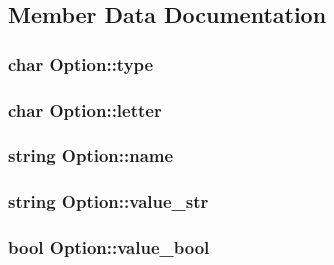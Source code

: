 \subsection{Member Data Documentation}
\hypertarget{struct_option_a08dcf2742c8429087baaacf694089cbe}{}
\subsubsection[{type}]{\setlength{\rightskip}{0pt plus 5cm}char Option\+::type}\label{struct_option_a08dcf2742c8429087baaacf694089cbe}
\hypertarget{struct_option_add92e993875c6dfd378c51418d253e84}{}
\subsubsection[{letter}]{\setlength{\rightskip}{0pt plus 5cm}char Option\+::letter}\label{struct_option_add92e993875c6dfd378c51418d253e84}
\hypertarget{struct_option_a2a2fd32b8112451bdfd96322c098b6a3}{}
\subsubsection[{name}]{\setlength{\rightskip}{0pt plus 5cm}string Option\+::name}\label{struct_option_a2a2fd32b8112451bdfd96322c098b6a3}
\hypertarget{struct_option_a3f52e913f047b38e95b1490d76eeff00}{}
\subsubsection[{value\+\_\+str}]{\setlength{\rightskip}{0pt plus 5cm}string Option\+::value\+\_\+str}\label{struct_option_a3f52e913f047b38e95b1490d76eeff00}
\hypertarget{struct_option_adfda258d1ec248be6deb65763cceaa07}{}
\subsubsection[{value\+\_\+bool}]{\setlength{\rightskip}{0pt plus 5cm}bool Option\+::value\+\_\+bool}\label{struct_option_adfda258d1ec248be6deb65763cceaa07}
\hypertarget{struct_option_a186e1e38cbb463db97e6ac0bd9df2c7f}{}

